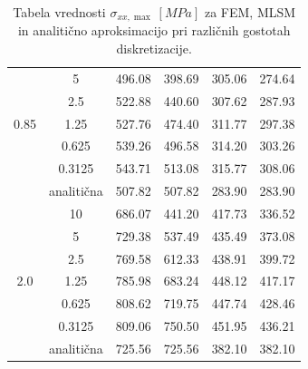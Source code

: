 \documentclass[12pt,a4paper,twoside]{article}
\theoremstyle{definition} %
\theoremstyle{plain} %
\numberwithin{equation}{section}
\newcommand{\ts}{\sigma}
\begin{document}
\begin{table}[h]
\begin{tabular}{ccllll}
                              & 5                  & 496.08                   & 398.69                  & 305.06                   & 274.64                  \\
                              & 2.5                & 522.88                   & 440.60                  & 307.62                   & 287.93                  \\
    0.85                      & 1.25               & 527.76                   & 474.40                  & 311.77                   & 297.38                  \\
                              & 0.625              & 539.26                   & 496.58                  & 314.20                   & 303.26                  \\
                              & 0.3125             & 543.71                   & 513.08                  & 315.77                   & 308.06                  \\ \cline{2-6}
                              & analitična         & 507.82                   & 507.82                  & 283.90                   & 283.90                  \\ \hline
                              & 10                 & 686.07                   & 441.20                  & 417.73                   & 336.52                  \\
                              & 5                  & 729.38                   & 537.49                  & 435.49                   & 373.08                  \\
                              & 2.5                & 769.58                   & 612.33                  & 438.91                   & 399.72                  \\
    2.0                       & 1.25               & 785.98                   & 683.24                  & 448.12                   & 417.17                  \\
                              & 0.625              & 808.62                   & 719.75                  & 447.74                   & 428.46                  \\
                              & 0.3125             & 809.06                   & 750.50                  & 451.95                   & 436.21                  \\ \cline{2-6}
                              & analitična         & 725.56                   & 725.56                  & 382.10                   & 382.10                  \\ \hline
  \end{tabular}
  \caption{Tabela vrednosti $\ts_{xx, \max}\ [\unit{MPa}]$ za FEM, MLSM in analitično aproksimacijo pri različnih gostotah diskretizacije.}
  \label{tab:sxxmax}
\end{table}
\end{document}
